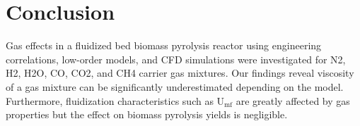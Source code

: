 
\section{Conclusion}

Gas effects in a fluidized bed biomass pyrolysis reactor using engineering correlations, low-order models, and CFD simulations were investigated for N2, H2, H2O, CO, CO2, and CH4 carrier gas mixtures. Our findings reveal viscosity of a gas mixture can be significantly underestimated depending on the model. Furthermore, fluidization characteristics such as U$_\text{mf}$ are greatly affected by gas properties but the effect on biomass pyrolysis yields is negligible.
